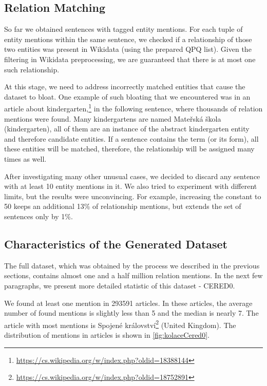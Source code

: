 \subsection{Relation Matching}
So far we obtained sentences with tagged entity mentions. For each tuple of entity mentions within the same sentence, we checked if a relationship of those two entities was present in Wikidata (using the prepared QPQ list). Given the filtering in Wikidata preprocessing, we are guaranteed that there is at most one such relationship. 

At this stage, we need to address incorrectly matched entities that cause the dataset to bloat. One example of such bloating that we encountered was in an article about kindergarten,\footnote{\url{https://cs.wikipedia.org/w/index.php?oldid=18388144}} in the following sentence, where thousands of relation mentions were found.   Many kindergartens are named Mateřská škola (kindergarten), all of them are an instance of the abstract kindergarten entity and therefore candidate entities. If a sentence contains the term  (or its form), all these entities will be matched, therefore, the relationship  will be assigned many times as well. 

After investigating many other unusual cases, we decided to discard any sentence with at least 10 entity mentions in it. We also tried to experiment with different limits, but the results were unconvincing. For example, increasing the constant to 50 keeps an additional 13\% of relationship mentions, but extends the set of sentences only by 1\%.


\subsection{Characteristics of the Generated Dataset}
The full dataset, which was obtained by the process we described in the previous sections, contains almost one and a half million relation mentions. In the next few paragraphs, we present more detailed statistic of this dataset - CERED0. 

We found at least one mention in \num{293591} articles. In these articles, the average number of found mentions is slightly less than 5 and the median is nearly 7. The article with most mentions is Spojené království\footnote{\url{https://cs.wikipedia.org/w/index.php?oldid=18752891}} (United Kingdom). The distribution of mentions in articles is shown in \autoref{fig:kolaceCered0}.

